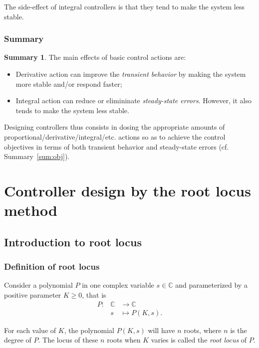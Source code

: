 \documentclass[a4paper,11pt]{report}
\theoremstyle{definition}
\newcommand{\bbC}{\mathbb{C}}
\newtheorem{mdsummary}{Summary}
\newenvironment{summary}%
  {\vspace{0.1cm}\begin{mdframed}[linecolor=red!60!black,
  linewidth=2pt]\begin{mdsummary}}%
  {\end{mdsummary}\end{mdframed}\vspace{0.1cm}}
\begin{document}
The side-effect of integral controllers is that they tend to make the
system less stable.

\subsection{Summary}

\begin{summary}
  The main effects of basic control actions are:
  \begin{itemize}
  \item Derivative action can improve the \emph{transient behavior}
    by making the system more stable and/or respond faster;
  \item Integral action can reduce or elimininate \emph{steady-state
      errors}. However, it also tends to make the system less stable.
  \end{itemize}
\end{summary}

Designing controllers thus consists in dosing the appropriate amounts
of proportional/derivative/integral/etc. actions so as to achieve the
control objectives in terms of both transient behavior and
steady-state errors (cf. Summary~\ref{sum:obj}).

\chapter{Controller design by the root locus method}
\label{chap:rl}

\section{Introduction to root locus}

\subsection{Definition of root locus}

Consider a polynomial $P$ in one complex variable $s\in\bbC$ and
parameterized by a positive parameter $K\geq 0$, that is
\begin{eqnarray}
  P :& \bbC & \rightarrow  \bbC  \nonumber \\
  & s & \mapsto  P(K,s). \nonumber
\end{eqnarray}

For each value of $K$, the polynomial $P(K,s)$ will have $n$ roots,
where $n$ is the degree of $P$. The locus of these $n$ roots when $K$
varies is called the \emph{root locus} of $P$.
\end{document}
